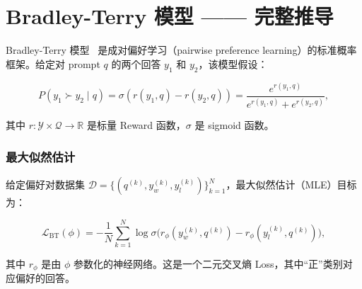 \section{Bradley-Terry 模型 —— 完整推导}
\label{sec:bradley-terry}

Bradley-Terry 模型~\cite{bradley1952rank} 是成对偏好学习（pairwise preference learning）的标准概率框架。给定对 prompt $q$ 的两个回答 $y_1$ 和 $y_2$，该模型假设：

\[
P(y_1 \succ y_2 \mid q) = \sigma(r(y_1, q) - r(y_2, q))
    = \frac{e^{r(y_1,q)}}{e^{r(y_1,q)} + e^{r(y_2,q)}},
\]

其中 $r: \mathcal{Y} \times \mathcal{Q} \to \mathbb{R}$ 是标量 Reward 函数，$\sigma$ 是 sigmoid 函数。

\subsubsection*{最大似然估计}
\label{maximum-likelihood-estimation}

给定偏好对数据集 $\mathcal{D} = \{(q^{(k)}, y_w^{(k)}, y_l^{(k)})\}_{k=1}^N$，最大似然估计（MLE）目标为：

\[
\mathcal{L}_{\text{BT}}(\phi) =
    -\frac{1}{N}\sum_{k=1}^N \log \sigma\!\bigl(r_\phi(y_w^{(k)}, q^{(k)}) - r_\phi(y_l^{(k)}, q^{(k)})\bigr),
\]

其中 $r_\phi$ 是由 $\phi$ 参数化的神经网络。这是一个二元交叉熵 Loss，其中“正”类别对应偏好的回答。


